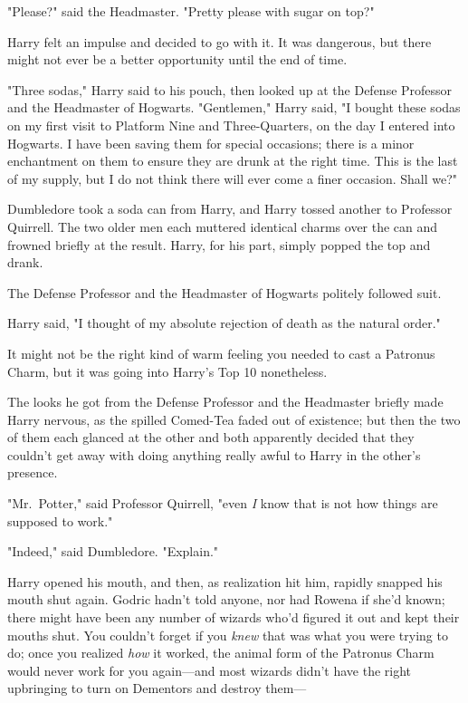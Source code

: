 "Please?" said the Headmaster. "Pretty please with sugar on top?"

Harry felt an impulse and decided to go with it. It was dangerous, but there 
might not ever be a better opportunity until the end of time.

"Three sodas," Harry said to his pouch, then looked up at the Defense Professor 
and the Headmaster of Hogwarts. "Gentlemen," Harry said, "I bought these sodas 
on my first visit to Platform Nine and Three-Quarters, on the day I entered 
into Hogwarts. I have been saving them for special occasions; there is a minor 
enchantment on them to ensure they are drunk at the right time. This is the 
last of my supply, but I do not think there will ever come a finer occasion. 
Shall we?"

Dumbledore took a soda can from Harry, and Harry tossed another to Professor 
Quirrell. The two older men each muttered identical charms over the can and 
frowned briefly at the result. Harry, for his part, simply popped the top and 
drank.

The Defense Professor and the Headmaster of Hogwarts politely followed suit.

Harry said, "I thought of my absolute rejection of death as the natural order."

It might not be the right kind of warm feeling you needed to cast a Patronus 
Charm, but it was going into Harry's Top 10 nonetheless.

The looks he got from the Defense Professor and the Headmaster briefly made 
Harry nervous, as the spilled Comed-Tea faded out of existence; but then the 
two of them each glanced at the other and both apparently decided that they 
couldn't get away with doing anything really awful to Harry in the other's 
presence.

"Mr.~Potter," said Professor Quirrell, "even \emph{I} know that is not how 
things are supposed to work."

"Indeed," said Dumbledore. "Explain."

Harry opened his mouth, and then, as realization hit him, rapidly snapped his 
mouth shut again. Godric hadn't told anyone, nor had Rowena if she'd known; 
there might have been any number of wizards who'd figured it out and kept their 
mouths shut. You couldn't forget if you \emph{knew} that was what you were 
trying to do; once you realized \emph{how} it worked, the animal form of the 
Patronus Charm would never work for you again---and most wizards didn't have 
the right upbringing to turn on Dementors and destroy them---

